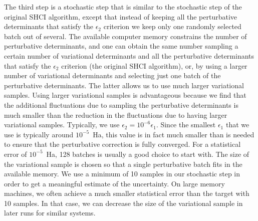 \documentclass[%
reprint,
 superscriptaddress,
 amsmath,amssymb,
 aps,
]{revtex4-1}
\def\beq{\begin{eqnarray}}
\def\eeq{\end{eqnarray}}
\begin{document}
The third step is a stochastic step that is similar to the stochastic step of the original SHCI algorithm, except that instead of keeping all the perturbative determinants
that satisfy the $\epsilon_2$ criterion we keep only one randomly selected batch out of several.
The available computer memory constrains the number of perturbative determinants, and one can obtain the same number sampling a certain
number of variational determinants and all the perturbative determinants that satisfy the $\epsilon_2$ criterion (the original SHCI algorithm),
or, by using a larger number of variational determinants and selecting just one batch of the perturbative determinants.
The latter allows us to use much larger variational samples.
Using larger variational samples is advantageous because we find that the additional fluctuations
due to sampling the perturbative determinants is much smaller than the reduction in the fluctuations due to having larger variational samples.
Typically, we use $\epsilon_2 = 10^{-6} \epsilon_{1}$.  Since the smallest $\epsilon_{1}$ that we use is typically around $10^{-5}$~Ha,
this value is in fact much smaller than is needed to ensure that the perturbative correction is fully converged.
For a statistical error of $10^{-5}$~Ha, 128 batches is usually a good choice to start with.
The size of the variational sample is chosen so that a single perturbative batch fits in the available memory.
We use a minimum of 10 samples in our stochastic step in order to get a meaningful estimate of the uncertainty.
On large memory machines, we often achieve a much smaller statistical error than the target with 10 samples.
In that case, we can decrease the size of the variational sample in later runs for similar systems.
\end{document}
